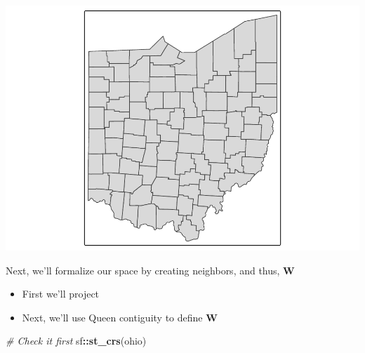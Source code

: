\documentclass[]{article}
\newenvironment{Shaded}{\begin{snugshade}}{\end{snugshade}}
\newcommand{\CommentTok}[1]{\textcolor[rgb]{0.56,0.35,0.01}{\textit{#1}}}
\newcommand{\FunctionTok}[1]{\textcolor[rgb]{0.13,0.29,0.53}{\textbf{#1}}}
\newcommand{\NormalTok}[1]{#1}
\newcommand{\SpecialCharTok}[1]{\textcolor[rgb]{0.81,0.36,0.00}{\textbf{#1}}}
\providecommand{\tightlist}{%
  \setlength{\itemsep}{0pt}\setlength{\parskip}{0pt}}
\begin{document}
\includegraphics{lab03_files/figure-latex/make_subset-1.pdf}

Next, we'll formalize our space by creating neighbors, and thus,
\textbf{W}

\begin{itemize}
\tightlist
\item
  First we'll project
\item
  Next, we'll use Queen contiguity to define \textbf{W}
\end{itemize}

\begin{Shaded}
\begin{Highlighting}[]
\CommentTok{\# Check it first}
\NormalTok{sf}\SpecialCharTok{::}\FunctionTok{st\_crs}\NormalTok{(ohio) }
\end{Highlighting}
\end{Shaded}
\end{document}
